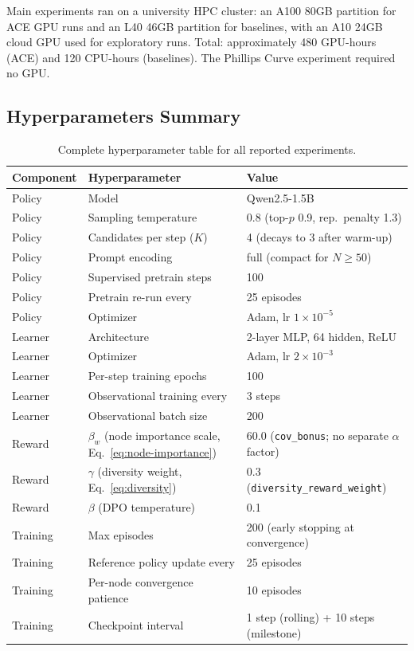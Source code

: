 Main experiments ran on a university HPC cluster: an A100 80GB partition for ACE GPU runs and an L40 46GB partition for baselines, with an A10 24GB cloud GPU used for exploratory runs. Total: approximately 480 GPU-hours (ACE) and 120 CPU-hours (baselines). The Phillips Curve experiment required no GPU.

\subsection{Hyperparameters Summary}
\label{app:hyper-summary}

\begin{table}[h]
\centering
\caption{Complete hyperparameter table for all reported experiments.}
\label{tab:hyper-summary}
\small
\begin{tabular}{@{}lll@{}}
\toprule
Component & Hyperparameter & Value \\
\midrule
Policy & Model & Qwen2.5-1.5B \\
Policy & Sampling temperature & 0.8 (top-$p$ 0.9, rep.\ penalty 1.3) \\
Policy & Candidates per step ($K$) & 4 (decays to 3 after warm-up) \\
Policy & Prompt encoding & full (compact for $N\!\geq\!50$) \\
Policy & Supervised pretrain steps & 100 \\
Policy & Pretrain re-run every & 25 episodes \\
Policy & Optimizer & Adam, lr $1 \times 10^{-5}$ \\
\midrule
Learner & Architecture & 2-layer MLP, 64 hidden, ReLU \\
Learner & Optimizer & Adam, lr $2 \times 10^{-3}$ \\
Learner & Per-step training epochs & 100 \\
Learner & Observational training every & 3 steps \\
Learner & Observational batch size & 200 \\
\midrule
Reward & $\beta_w$ (node importance scale, Eq.~\ref{eq:node-importance}) & 60.0 (\texttt{cov\_bonus}; no separate $\alpha$ factor) \\
Reward & $\gamma$ (diversity weight, Eq.~\ref{eq:diversity}) & 0.3 (\texttt{diversity\_reward\_weight}) \\
Reward & $\beta$ (DPO temperature) & 0.1 \\
\midrule
Training & Max episodes & 200 (early stopping at convergence) \\
Training & Reference policy update every & 25 episodes \\
Training & Per-node convergence patience & 10 episodes \\
Training & Checkpoint interval & 1 step (rolling) + 10 steps (milestone) \\
\bottomrule
\end{tabular}
\end{table}


